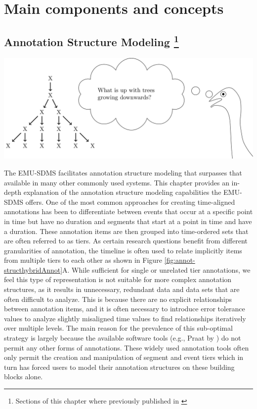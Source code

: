 \documentclass[]{book}
\let\rmarkdownfootnote\footnote%
\def\footnote{\protect\rmarkdownfootnote}
\theoremstyle{definition}
\theoremstyle{definition}
\theoremstyle{definition}
\theoremstyle{remark}
\begin{document}
\hypertarget{part-main-components-and-concepts}{%
\part{Main components and
concepts}\label{part-main-components-and-concepts}}

\hypertarget{chap:annot_struct_mod}{%
\chapter[Annotation Structure Modeling ]{\texorpdfstring{Annotation
Structure Modeling \footnote{Sections of this chapter where previously
  published in \citet{winkelmann:2017aa}}}{Annotation Structure Modeling }}\label{chap:annot_struct_mod}}

\begin{center}\includegraphics[width=0.75\linewidth]{pics/EMU-webAppEmu_annotStruct} \end{center}

The EMU-SDMS facilitates annotation structure modeling that surpasses
that available in many other commonly used systems. This chapter
provides an in-depth explanation of the annotation structure modeling
capabilities the EMU-SDMS offers. One of the most common approaches for
creating time-aligned annotations has been to differentiate between
events that occur at a specific point in time but have no duration and
segments that start at a point in time and have a duration. These
annotation items are then grouped into time-ordered sets that are often
referred to as tiers. As certain research questions benefit from
different granularities of annotation, the timeline is often used to
relate implicitly items from multiple tiers to each other as shown in
Figure \ref{fig:annot-structhybridAnnot}A. While sufficient for single
or unrelated tier annotations, we feel this type of representation is
not suitable for more complex annotation structures, as it results in
unnecessary, redundant data and data sets that are often difficult to
analyze. This is because there are no explicit relationships between
annotation items, and it is often necessary to introduce error tolerance
values to analyze slightly misaligned time values to find relationships
iteratively over multiple levels. The main reason for the prevalence of
this sub-optimal strategy is largely because the available software
tools (e.g., Praat by \citet{boersma:2011a}) do not permit any other
forms of annotations. These widely used annotation tools often only
permit the creation and manipulation of segment and event tiers which in
turn has forced users to model their annotation structures on these
building blocks alone.
\end{document}
